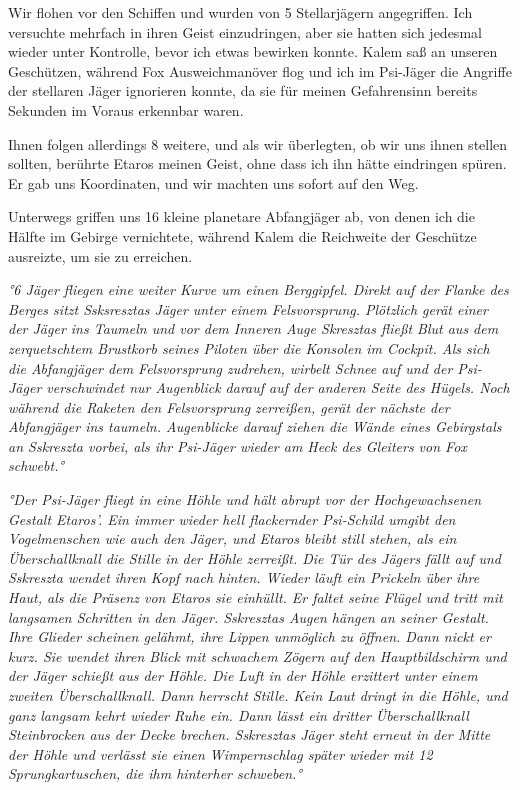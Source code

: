 \documentclass[11pt]{scrartcl}
\begin{document}
Wir flohen vor den Schiffen und wurden von 5 Stellarjägern angegriffen.
Ich versuchte mehrfach in ihren Geist einzudringen, aber sie hatten sich
jedesmal wieder unter Kontrolle, bevor ich etwas bewirken konnte. Kalem
saß an unseren Geschützen, während Fox Ausweichmanöver flog und ich im
Psi-Jäger die Angriffe der stellaren Jäger ignorieren konnte, da sie für
meinen Gefahrensinn bereits Sekunden im Voraus erkennbar waren.

Ihnen folgen allerdings 8 weitere, und als wir überlegten, ob wir uns
ihnen stellen sollten, berührte Etaros meinen Geist, ohne dass ich ihn
hätte eindringen spüren. Er gab uns Koordinaten, und wir machten uns
sofort auf den Weg.

Unterwegs griffen uns 16 kleine planetare Abfangjäger ab, von denen ich
die Hälfte im Gebirge vernichtete, während Kalem die Reichweite der
Geschütze ausreizte, um sie zu erreichen.

\emph{°6 Jäger fliegen eine weiter Kurve um einen Berggipfel. Direkt auf
der Flanke des Berges sitzt Ssksresztas Jäger unter einem Felsvorsprung.
Plötzlich gerät einer der Jäger ins Taumeln und vor dem Inneren Auge
Skresztas fließt Blut aus dem zerquetschtem Brustkorb seines Piloten
über die Konsolen im Cockpit. Als sich die Abfangjäger dem Felsvorsprung
zudrehen, wirbelt Schnee auf und der Psi-Jäger verschwindet nur
Augenblick darauf auf der anderen Seite des Hügels. Noch während die
Raketen den Felsvorsprung zerreißen, gerät der nächste der Abfangjäger
ins taumeln. Augenblicke darauf ziehen die Wände eines Gebirgstals an
Sskreszta vorbei, als ihr Psi-Jäger wieder am Heck des Gleiters von Fox
schwebt.°}

\emph{°Der Psi-Jäger fliegt in eine Höhle und hält abrupt vor der
Hochgewachsenen Gestalt Etaros'. Ein immer wieder hell flackernder
Psi-Schild umgibt den Vogelmenschen wie auch den Jäger, und Etaros
bleibt still stehen, als ein Überschallknall die Stille in der Höhle
zerreißt. Die Tür des Jägers fällt auf und Sskreszta wendet ihren Kopf
nach hinten. Wieder läuft ein Prickeln über ihre Haut, als die Präsenz
von Etaros sie einhüllt. Er faltet seine Flügel und tritt mit langsamen
Schritten in den Jäger. Sskresztas Augen hängen an seiner Gestalt. Ihre
Glieder scheinen gelähmt, ihre Lippen unmöglich zu öffnen. Dann nickt er
kurz. Sie wendet ihren Blick mit schwachem Zögern auf den
Hauptbildschirm und der Jäger schießt aus der Höhle. Die Luft in der
Höhle erzittert unter einem zweiten Überschallknall. Dann herrscht
Stille. Kein Laut dringt in die Höhle, und ganz langsam kehrt wieder
Ruhe ein. Dann lässt ein dritter Überschallknall Steinbrocken aus der
Decke brechen. Sskresztas Jäger steht erneut in der Mitte der Höhle und
verlässt sie einen Wimpernschlag später wieder mit 12 Sprungkartuschen,
die ihm hinterher schweben.°}
\end{document}

